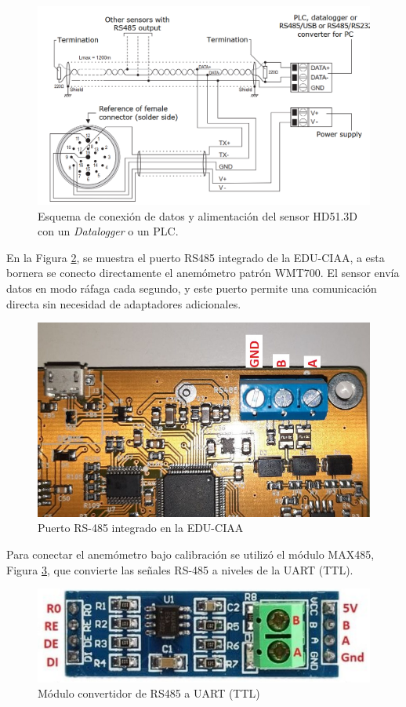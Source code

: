 \begin{figure}[H]
    \centering
    \includegraphics[width=0.8\linewidth]{Figuras/datalogger/Hardware/rs485DeltaOhm.png}
    \caption{Esquema de conexión de datos y alimentación del sensor HD51.3D con un \textit{Datalogger} o un PLC.  \cite{DeltaOHM_HD51.3D_manual}}
    \label{fig:rs485DeltaOhm}
\end{figure}
En la Figura \ref{fig:rs485CIAA}, se muestra el puerto RS485 integrado de la EDU-CIAA, a esta bornera se conecto directamente el anemómetro patrón WMT700. El sensor envía datos en modo ráfaga cada segundo, y este puerto permite una comunicación directa sin necesidad de adaptadores adicionales.
\begin{figure}[H]
    \centering
    \includegraphics[width=0.45\linewidth]{Figuras/datalogger/Hardware/rs485CIAA.jpg}
    \caption{Puerto RS-485 integrado en la EDU-CIAA}
    \label{fig:rs485CIAA}
\end{figure}

Para conectar el anemómetro bajo calibración se utilizó el módulo MAX485, Figura \ref{fig:moduleMax485}, que convierte las señales RS-485 a niveles de la UART (TTL). 
\begin{figure}[H]
    \centering
    \includegraphics[width=0.5\linewidth]{Figuras/datalogger/Hardware/moduleMax485.png}
    \caption{Módulo convertidor de RS485 a UART (TTL)}
    \label{fig:moduleMax485}
\end{figure}

